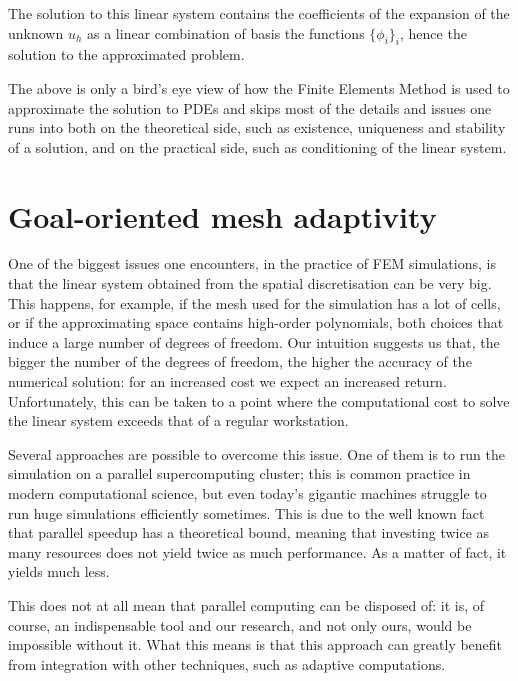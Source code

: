 The solution to this linear system contains the coefficients of the
expansion of the unknown \(u_h\) as a linear combination of basis the
functions \(\{\phi_i\}_i\), hence the solution to the approximated
problem.

The above is only a bird's eye view of how the Finite Elements Method is
used to approximate the solution to PDEs and skips most of the details
and issues one runs into both on the theoretical side, such as existence,
uniqueness and stability of a solution, and on the practical side, such
as conditioning of the linear system.

\section{Goal-oriented mesh adaptivity}
\label{sec_adaptivity}
One of the biggest issues one encounters, in the practice of FEM
simulations, is that the linear system obtained from the spatial
discretisation can be very big.
This happens, for example, if the mesh used for the simulation has a lot of cells, or
if the approximating space contains high-order polynomials,
both choices that induce a large number of degrees of freedom.
Our intuition suggests us that, the bigger the number of the degrees of freedom, the
higher the accuracy of the numerical solution: for an increased cost we
expect an increased return.
Unfortunately, this can be taken to a point where the computational cost to solve the
linear system exceeds that of a regular workstation.

Several approaches are possible to overcome this issue.
One of them is to run the simulation on a parallel supercomputing
cluster; this is common practice in modern computational science, but
even today's gigantic machines struggle to run huge simulations efficiently sometimes.
This is due to the well known fact that parallel speedup has a
theoretical bound, meaning that investing twice as many resources does
not yield twice as much performance.
As a matter of fact, it yields much less.

This does not at all mean that parallel computing can be disposed of: it
is, of course, an indispensable tool and our research, and not only ours,
would be impossible without it.
What this means is that this approach can greatly benefit from
integration with other techniques, such as adaptive computations.

